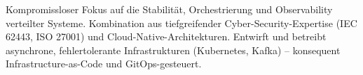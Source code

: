 %
%
%

\par{
Kompromissloser Fokus auf die Stabilität, Orchestrierung und Observability verteilter Systeme. Kombination aus tiefgreifender Cyber-Security-Expertise (IEC 62443, ISO 27001) und Cloud-Native-Architekturen. Entwirft und betreibt asynchrone, fehlertolerante Infrastrukturen (Kubernetes, Kafka) – konsequent Infrastructure-as-Code und GitOps-gesteuert.
\vspace{1em}
}
